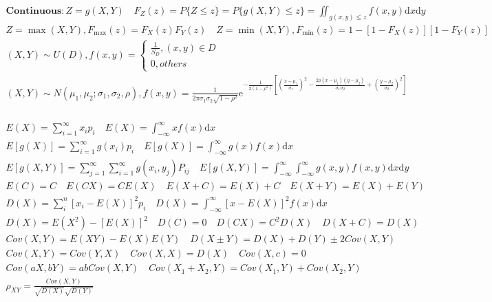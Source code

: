 \documentclass{article}
\begin{document}
\begin{align*}
    \bm{Continuous} : Z = g(X,Y) \quad F_{Z}(z)=P\{Z\le z\} = P\{g(X,Y)\le z\} = \iint_{g(x,y)\le z}f(x,y)\mathrm{d}x\mathrm{d}y \\
    Z=\max(X,Y),F_{\max}(z)=F_{X}(z)F_{Y}(z) \quad Z=\min(X,Y),F_{\min}(z)=1-[1-F_{X}(z)][1-F_{Y}(z)] \\ 
    (X,Y) \sim U(D), 
    f(x,y) = \left\{ 
    \begin{array}{rl} 
        \frac{1}{S_{D}}, (x,y) \in D\\ 
        0, others
    \end{array} \right. \ \\ 
    (X,Y) \sim N(\mu_{1},\mu_{2};\sigma_{1},\sigma_{2},\rho),f(x,y) = \frac{1}{2\pi \sigma_{1} \sigma_{2} \sqrt{1-\rho^2}} \mathrm{e}^{-\frac{1}{2(1-\rho^2)}[(\frac{x-\mu_{1}}{\sigma_{1}})^2-\frac{2\rho (x-\mu_{1})(y-\mu_{2})}{\sigma_{1}\sigma_{2}}+(\frac{y-\mu_{2}}{\sigma_{2}})^2]} \\
\end{align*}
\clearpage

\begin{align*}
    E(X) = \sum_{i=1}^{\infty}x_{i}p_{i} \quad E(X) = \int_{-\infty}^{\infty}xf(x)\mathrm{d} x \\  
    E[g(X)] = \sum_{i=1}^{\infty}g(x_{i})p_{i} \quad E[g(X)] = \int_{-\infty}^{\infty}g(x)f(x)\mathrm{d} x \\
    E[g(X,Y)] = \sum_{j=1}^{\infty}\sum_{i=1}^{\infty}g(x_{i},y_{j})P_{ij} \quad E[g(X,Y)] = \int_{-\infty}^{\infty}\int_{-\infty}^{\infty}g(x,y)f(x,y)\mathrm{d}x\mathrm{d}y \\ 
    E(C) = C \quad E(CX) = CE(X) \quad E(X+C) = E(X)+C \quad E(X+Y) = E(X)+E(Y) \\ 
    D(X) = \sum_{i}^{n}[x_{i}-E(X)]^2p_{i} \quad D(X) = \int_{-\infty}^{\infty}[x-E(X)]^2f(x)\mathrm{d}x \\ 
    D(X) = E(X^2)-[E(X)]^2 \quad D(C) = 0 \quad D(CX)=C^2D(X) \quad D(X+C) = D(X) \\ 
    Cov(X,Y) = E(XY) - E(X)E(Y) \quad D(X\pm Y) = D(X)+D(Y)\pm 2Cov(X,Y) \\ 
    Cov(X,Y) = Cov(Y,X) \quad Cov(X,X) = D(X) \quad Cov(X,c) = 0 \\ 
    Cov(aX,bY) = abCov(X,Y) \quad Cov(X_{1}+X_{2},Y) = Cov(X_{1},Y)+Cov(X_{2},Y) \\ 
    \rho_{XY} = \frac{Cov(X,Y)}{\sqrt{D(X)}\sqrt{D(Y)}} \\ 
\end{align*}
\end{document}
